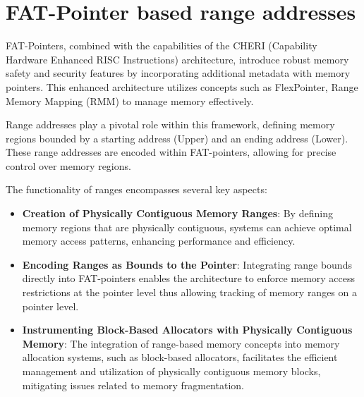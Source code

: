 \documentclass[acmsmall,screen,review]{acmart}
\begin{document}
\section{FAT-Pointer based range addresses}


FAT-Pointers, combined with the capabilities of the CHERI (Capability Hardware Enhanced RISC Instructions) 
architecture, introduce robust memory safety and security features by incorporating additional metadata 
with memory pointers. This enhanced architecture utilizes concepts such as FlexPointer, 
Range Memory Mapping (RMM) to manage memory effectively.

Range addresses play a pivotal role within this framework, defining memory 
regions bounded by a starting address (Upper) and an ending address (Lower). 
These range addresses are encoded within FAT-pointers, allowing for precise 
control over memory regions.

The functionality of ranges encompasses several key aspects:
\begin{itemize}
\item \textbf{Creation of Physically Contiguous Memory Ranges}:
By defining memory regions that are physically contiguous, systems can 
achieve optimal memory access patterns, enhancing performance and efficiency.
\item \textbf{Encoding Ranges as Bounds to the Pointer}:
Integrating range bounds directly into FAT-pointers enables the architecture 
to enforce memory access restrictions at the pointer level thus allowing 
tracking of memory ranges on a pointer level.
\item \textbf{Instrumenting Block-Based Allocators with Physically Contiguous Memory}:
The integration of range-based memory concepts into memory allocation systems, such as block-based 
allocators, facilitates the efficient management and utilization of physically contiguous memory blocks, 
mitigating issues related to memory fragmentation.
\end{itemize}
\end{document}
